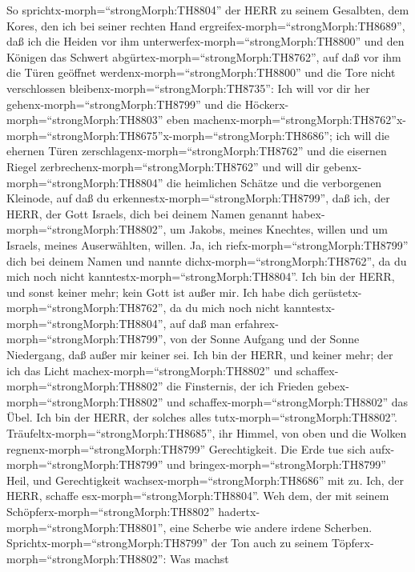  So sprichtx-morph=``strongMorph:TH8804'' der HERR zu seinem
Gesalbten, dem Kores, den ich bei seiner rechten Hand
ergreifex-morph=``strongMorph:TH8689'', daß ich die Heiden vor ihm
unterwerfex-morph=``strongMorph:TH8800'' und den Königen das Schwert
abgürtex-morph=``strongMorph:TH8762'', auf daß vor ihm die Türen
geöffnet werdenx-morph=``strongMorph:TH8800'' und die Tore nicht
verschlossen bleibenx-morph=``strongMorph:TH8735'':  Ich
will vor dir her gehenx-morph=``strongMorph:TH8799'' und die
Höckerx-morph=``strongMorph:TH8803'' eben
machenx-morph=``strongMorph:TH8762''\textbar x-morph=``strongMorph:TH8675''x-morph=``strongMorph:TH8686'';
ich will die ehernen Türen zerschlagenx-morph=``strongMorph:TH8762'' und
die eisernen Riegel zerbrechenx-morph=``strongMorph:TH8762''
 und will dir gebenx-morph=``strongMorph:TH8804'' die
heimlichen Schätze und die verborgenen Kleinode, auf daß du
erkennestx-morph=``strongMorph:TH8799'', daß ich, der HERR, der Gott
Israels, dich bei deinem Namen genannt
habex-morph=``strongMorph:TH8802'',  um Jakobs, meines
Knechtes, willen und um Israels, meines Auserwählten, willen. Ja, ich
riefx-morph=``strongMorph:TH8799'' dich bei deinem Namen und nannte
dichx-morph=``strongMorph:TH8762'', da du mich noch nicht
kanntestx-morph=``strongMorph:TH8804''.  Ich bin der HERR,
und sonst keiner mehr; kein Gott ist außer mir. Ich habe dich
gerüstetx-morph=``strongMorph:TH8762'', da du mich noch nicht
kanntestx-morph=``strongMorph:TH8804'',  auf daß man
erfahrex-morph=``strongMorph:TH8799'', von der Sonne Aufgang und der
Sonne Niedergang, daß außer mir keiner sei. Ich bin der HERR, und keiner
mehr;  der ich das Licht machex-morph=``strongMorph:TH8802''
und schaffex-morph=``strongMorph:TH8802'' die Finsternis, der ich
Frieden gebex-morph=``strongMorph:TH8802'' und
schaffex-morph=``strongMorph:TH8802'' das Übel. Ich bin der HERR, der
solches alles tutx-morph=``strongMorph:TH8802''. 
Träufeltx-morph=``strongMorph:TH8685'', ihr Himmel, von oben und die
Wolken regnenx-morph=``strongMorph:TH8799'' Gerechtigkeit. Die Erde tue
sich aufx-morph=``strongMorph:TH8799'' und
bringex-morph=``strongMorph:TH8799'' Heil, und Gerechtigkeit
wachsex-morph=``strongMorph:TH8686'' mit zu. Ich, der HERR, schaffe
esx-morph=``strongMorph:TH8804''.  Weh dem, der mit seinem
Schöpferx-morph=``strongMorph:TH8802''
hadertx-morph=``strongMorph:TH8801'', eine Scherbe wie andere irdene
Scherben. Sprichtx-morph=``strongMorph:TH8799'' der Ton auch zu seinem
Töpferx-morph=``strongMorph:TH8802'': Was machst
